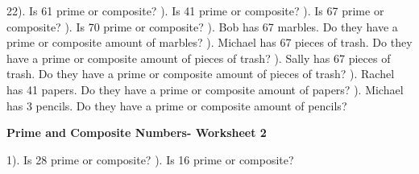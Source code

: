 \documentclass{article}%
\begin{document}
22). Is 61 prime or composite?%
\newline%
\newline%
). Is 41 prime or composite?%
\newline%
\newline%
). Is 67 prime or composite?%
\newline%
\newline%
). Is 70 prime or composite?%
\newline%
\newline%
). Bob has 67 marbles. Do they have a prime or composite amount of marbles?%
\newline%
\newline%
). Michael has 67 pieces of trash. Do they have a prime or composite amount of pieces of trash?%
\newline%
\newline%
). Sally has 67 pieces of trash. Do they have a prime or composite amount of pieces of trash?%
\newline%
\newline%
). Rachel has 41 papers. Do they have a prime or composite amount of papers?%
\newline%
\newline%
). Michael has 3 pencils. Do they have a prime or composite amount of pencils?%
\newline%
\newline%
\newline%
\pagebreak%
\large%
\begin{center}%
\textbf{Prime and Composite Numbers- Worksheet 2}%
\newline%
\newline%
\newline%
\end{center} \normalsize%
1). Is 28 prime or composite?%
\newline%
\newline%
). Is 16 prime or composite?%
\newline%
\newline%
\newline%
\end{document}
